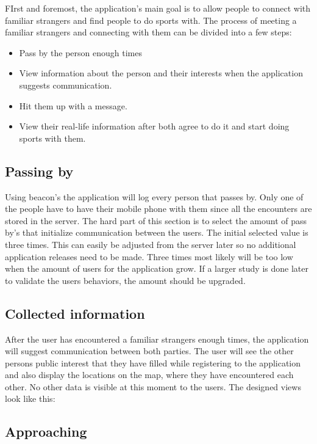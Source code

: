 FIrst and foremost, the application's main goal is to allow people to connect with familiar strangers and find people to do sports with. The process of meeting a familiar strangers and connecting with them can be divided into a few steps:

\begin{itemize}
	\item Pass by the person enough times
	\item View information about the person and their interests when the application suggests communication.
	\item Hit them up with a message.
	\item View their real-life information after both agree to do it and start doing sports with them.
\end{itemize}

\subsection{Passing by}

Using beacon's the application will log every person that passes by. Only one of the people have to have their mobile phone with them since all the encounters are stored in the server. The hard part of this section is to select the amount of pass by's that initialize communication between the users. The initial selected value is three times. This can easily be adjusted from the server later so no additional application releases need to be made. Three times most likely will be too low when the amount of users for the application grow. If a larger study is done later to validate the users behaviors, the amount should be upgraded.

\subsection{Collected information}

After the user has encountered a familiar strangers enough times, the application will suggest communication between both parties. The user will see the other persons public interest that they have filled while registering to the application and also display the locations on the map, where they have encountered each other. No other data is visible at this moment to the users. The designed views look like this:

\subsection{Approaching}

